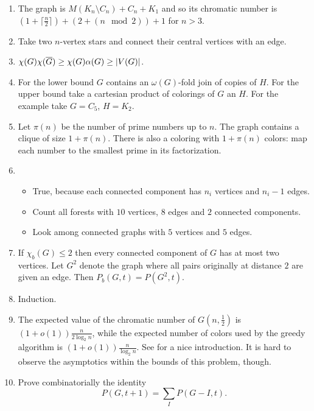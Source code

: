 \begin{enumerate}

\item The graph is $M(K_n\setminus C_n) + C_n + K_1$ and so its chromatic number is $(1+\lceil\frac{n}{2}\rceil) + (2+(n \mod 2)) + 1$ for $n>3$.

\item Take two $n$-vertex stars and connect their central vertices with an edge.

\item $\chi(G)\chi(\overline{G})\geq \chi(G)\alpha(G)\geq |V(G)|$.

\item For the lower bound $G$ contains an $\omega(G)$-fold join of copies of $H$. For the upper bound take a cartesian product of colorings of $G$ an $H$. For the example take $G=C_5$, $H=K_2$.

\item Let $\pi(n)$ be the number of prime numbers up to $n$. The graph contains a clique of size $1+\pi(n)$. There is also a coloring with $1+\pi(n)$ colors: map each number to the smallest prime in its factorization.

\item 
\begin{itemize}
\item True, because each connected component has $n_i$ vertices and $n_i-1$ edges.
\item Count all forests with $10$ vertices, $8$ edges and $2$ connected components. 
\item Look among connected graphs with $5$ vertices and $5$ edges.
\end{itemize}

\item If $\chi_b(G)\leq 2$ then every connected component of $G$ has at most two vertices. Let $G^2$ denote the graph where all pairs originally at distance $2$ are given an edge. Then $P_b(G,t)=P(G^2,t)$.

\item Induction. 

\item The expected value of the chromatic number of $G(n,\frac12)$ is $(1+o(1))\frac{n}{2\log_2n}$, while the expected number of colors used by the greedy algorithm is $(1+o(1))\frac{n}{\log_2n}$. See \cite{krivelevich} for a nice introduction. It is hard to observe the asymptotics within the bounds of this problem, though.

\item Prove combinatorially the identity
$$P(G, t+1) = \sum_I P(G-I, t).$$


\end{enumerate}
